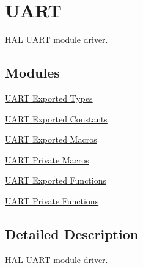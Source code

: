 \hypertarget{group___u_a_r_t}{}\section{U\+A\+RT}
\label{group___u_a_r_t}


H\+AL U\+A\+RT module driver.  


\subsection*{Modules}
\begin{DoxyCompactItemize}
\item 
\hyperlink{group___u_a_r_t___exported___types}{U\+A\+R\+T Exported Types}
\item 
\hyperlink{group___u_a_r_t___exported___constants}{U\+A\+R\+T Exported Constants}
\item 
\hyperlink{group___u_a_r_t___exported___macros}{U\+A\+R\+T Exported Macros}
\item 
\hyperlink{group___u_a_r_t___private___macros}{U\+A\+R\+T Private Macros}
\item 
\hyperlink{group___u_a_r_t___exported___functions}{U\+A\+R\+T Exported Functions}
\item 
\hyperlink{group___u_a_r_t___private___functions}{U\+A\+R\+T Private Functions}
\end{DoxyCompactItemize}


\subsection{Detailed Description}
H\+AL U\+A\+RT module driver. 

